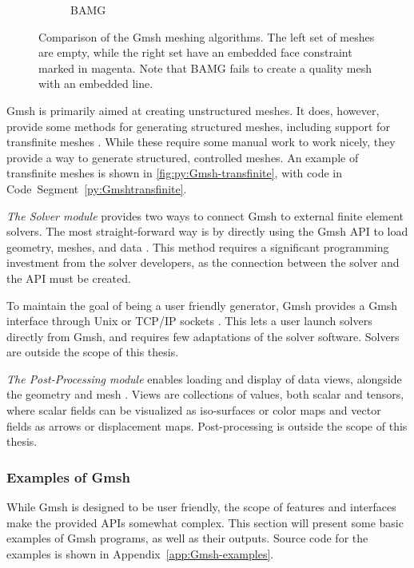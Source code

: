 \begin{figure}[p]
\begin{subfigure}[b]{\textwidth}
\begin{subfigure}[b]{0.32\textwidth}
        \end{subfigure}
        \caption{BAMG}
        \label{fig:Gmsh-BAMG}
    \end{subfigure}
    \caption[Comparison of the Gmsh meshing algorithms]{Comparison of the Gmsh meshing algorithms. The left set of meshes are empty, while the right set have an embedded face constraint marked in magenta. Note that BAMG fails to create a quality mesh with an embedded line.}
    \label{fig:Gmsh-meshing-algorithms}
\end{figure}

Gmsh is primarily aimed at creating unstructured meshes. It does, however, provide some methods for generating structured meshes, including support for transfinite meshes \cite{Gmsh_article}. While these require some manual work to work nicely, they provide a way to generate structured, controlled meshes. An example of transfinite meshes is shown in \autoref{fig:py:Gmsh-transfinite}, with code in Code~Segment~\ref{py:Gmshtransfinite}.

\emph{The Solver module} provides two ways to connect Gmsh to external finite element solvers. The most straight-forward way is by directly using the Gmsh API to load geometry, meshes, and data \cite{Gmsh_article}. This method requires a significant programming investment from the solver developers, as the connection between the solver and the API must be created.

To maintain the goal of being a user friendly generator, Gmsh provides a Gmsh interface through Unix or TCP/IP sockets \cite{Gmsh_article}. This lets a user launch solvers directly from Gmsh, and requires few adaptations of the solver software. Solvers are outside the scope of this thesis.

\emph{The Post-Processing module} enables loading and display of data views, alongside the geometry and mesh \cite{Gmsh_article}. Views are collections of values, both scalar and tensors, where scalar fields can be visualized as iso-surfaces or color maps and vector fields as arrows or displacement maps. Post-processing is outside the scope of this thesis. 


\subsubsection{Examples of Gmsh}
\label{sec:Gmsh-examples}
While Gmsh is designed to be user friendly, the scope of features and interfaces make the provided APIs somewhat complex. This section will present some basic examples of Gmsh programs, as well as their outputs. Source code for the examples is shown in Appendix~\ref{app:Gmsh-examples}.

